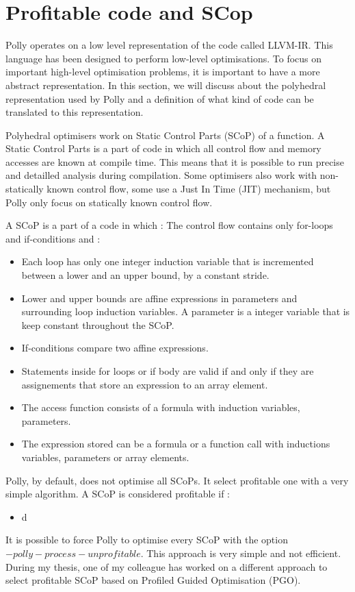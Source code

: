 \section{Profitable code and SCop}
Polly operates on a low level representation of the code called LLVM-IR. This language has been designed to perform low-level optimisations. To focus on important high-level optimisation problems, it is important to have a more abstract representation. In this section, we will discuss about the polyhedral representation used by Polly and a definition of what kind of code can be translated to this representation.

Polyhedral optimisers work on Static Control Parts (SCoP) of a function. A Static Control Parts is a part of code in which all control flow and memory accesses are known at compile time. This means that it is possible to run precise and detailled analysis during compilation. Some optimisers also work with non-statically known control flow, some use a Just In Time (JIT) mechanism, but Polly only focus on statically known control flow. 

\begin{definition}{}
A SCoP is a part of a code in which :
The control flow contains only for-loops and if-conditions and :
\begin{itemize}
\item Each loop has only one integer induction variable that is incremented between a lower and an upper bound, by a constant stride.
\item Lower and upper bounds are affine expressions in parameters and surrounding loop induction variables. A parameter is a integer variable that is keep constant throughout the SCoP.
\item If-conditions compare two affine expressions.
\item Statements inside for loops or if body are valid if and only if they are assignements that store an expression to an array element.
\item The access function consists of a formula with induction variables, parameters.
\item The expression stored can be a formula or a function call with inductions variables, parameters or array elements.
\end{itemize}\end{definition}

Polly, by default, does not optimise all SCoPs. It select profitable one with a very simple algorithm. A SCoP is considered profitable if :
\begin{itemize}
\item d
\end{itemize}
It is possible to force Polly to optimise every SCoP with the option $-polly-process-unprofitable$. This approach is very simple and not efficient. During my thesis, one of my colleague has worked on a different approach to select profitable SCoP based on Profiled Guided Optimisation (PGO).

